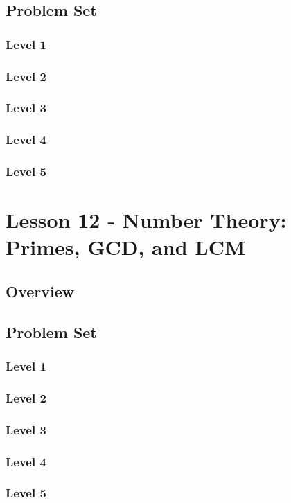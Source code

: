 \documentclass{article}
\begin{document}
\subsection{Problem Set}
\subsubsection{Level 1}
\subsubsection{Level 2}
\subsubsection{Level 3}
\subsubsection{Level 4}
\subsubsection{Level 5}
\pagebreak

\section{Lesson 12 - Number Theory: Primes, GCD, and LCM}
\subsection{Overview}
\subsection{Problem Set}
\subsubsection{Level 1}
\subsubsection{Level 2}
\subsubsection{Level 3}
\subsubsection{Level 4}
\subsubsection{Level 5}
\pagebreak
\end{document}

